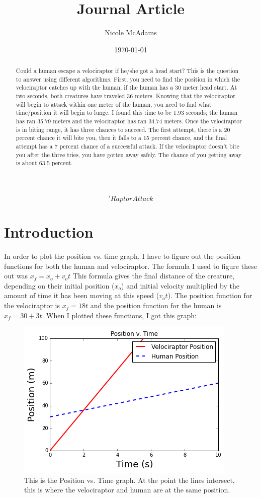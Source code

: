 \documentclass[twocolumn]{revtex4}
\begin{document}
\title{
Journal Article
}

\author{Nicole McAdams}

\date{\today}

\begin{abstract}
Could a human escape a velociraptor if he/she got a head start? This is the question to answer using different algorithms.  First, you need to find the position in which the velociraptor catches up with the human, if the human has a 30 meter head start.  At two seconds, both creatures have traveled 36 meters.  Knowing that the velociraptor will begin to attack within one meter of the human, you need to find what time/position it will begin to lunge.  I found this time to be 1.93 seconds; the human has ran 35.79 meters and the velociraptor has ran 34.74 meters.  Once the velociraptor is in biting range, it has three chances to succeed.  The first attempt, there is a 20 percent chance it will bite you, then it falls to a 15 percent chance, and the final attempt has a 7 percent chance of a successful attack.  If the velociraptor doesn't bite you after the three tries, you have gotten away safely.  The chance of you getting away is about 63.5 percent.   

\end{abstract}

\maketitle 
$$ 'Raptor Attack$$

\section{Introduction} 

In order to plot the position vs. time graph, I have to figure out the position functions for both the human and velociraptor.  The formula I used to figure these out was $ x_f = x_o + v_ot $ This formula gives the final distance of the creature, depending on their initial position ($x_o$) and initial velocity multiplied by the amount of time it has been moving at this speed ($v_ot$).  The position function for the velociraptor is $ x_f =  18t $ and the position function for the human is $ x_f = 30 + 3t $.  When I plotted these functions, I got this graph: 

\begin{figure}[h!]
	\centering
	\includegraphics[width = .5\textwidth]{p v t graph 1.png}
	\caption{This is the Position vs. Time graph.  At the point the lines intersect, this is where the velociraptor and human are at the same position.  \label{ptoe}}
\end{figure}
\end{document}
